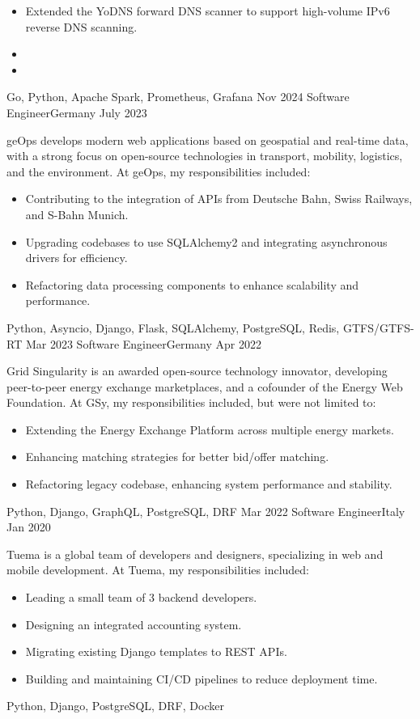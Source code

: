 \begin{experiences}
{        \begin{itemize}
            \item Extended the YoDNS forward DNS scanner to support high-volume IPv6 reverse DNS scanning.
            \item
            \item
        \end{itemize}
    }
    {Go, Python, Apache Spark, Prometheus, Grafana}
  \emptySeparator
  \experience
    {Nov 2024} {Software Engineer}{}{Germany}
    {July 2023} {
      geOps develops modern web applications based on geospatial and real-time data,
      with a strong focus on open-source technologies in transport, mobility, logistics,
      and the environment. At geOps, my responsibilities included:
      \begin{itemize}
        \item Contributing to the integration of APIs from Deutsche Bahn, Swiss Railways, and S-Bahn Munich.
        \item Upgrading codebases to use SQLAlchemy2 and integrating asynchronous drivers for efficiency.
        \item Refactoring data processing components to enhance scalability and performance.
      \end{itemize}
    }
    {Python, Asyncio, Django, Flask, SQLAlchemy, PostgreSQL, Redis, GTFS/GTFS-RT}
  \emptySeparator
  \experience
  {Mar 2023} {Software Engineer}{}{Germany}
  {Apr 2022} {
    Grid Singularity is an awarded open-source technology innovator,
    developing peer-to-peer energy exchange marketplaces, and a cofounder
    of the Energy Web Foundation. At GSy, my responsibilities included,
    but were not limited to:
    \begin{itemize}
      \item Extending the Energy Exchange Platform across multiple energy markets.
      \item Enhancing matching strategies for better bid/offer matching.
      \item Refactoring legacy codebase, enhancing system performance and stability.
    \end{itemize}
  }
  {Python, Django, GraphQL, PostgreSQL, DRF}
  \emptySeparator
  \experience
  {Mar 2022} {Software Engineer}{}{Italy}
  {Jan 2020} {
    Tuema is a global team of developers and designers, specializing in web and mobile development.
    At Tuema, my responsibilities included:
    \begin{itemize}
      \item Leading a small team of 3 backend developers.
      \item Designing an integrated accounting system.
      \item Migrating existing Django templates to REST APIs.
      \item Building and maintaining CI/CD pipelines to reduce deployment time.
    \end{itemize}
  }
  {Python, Django, PostgreSQL, DRF, Docker}
  \emptySeparator
\end{experiences}
